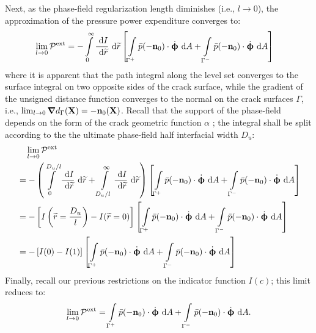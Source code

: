 Next, as the phase-field regularization length diminishes (i.e., $l \to 0$), the approximation of the pressure power expenditure converges to:
\begin{subequations}
  \begin{align}
    \lim_{l \to 0} \mathcal{P}^\text{ext} & = - \int\limits_0^\infty \dfrac{\text{ d}I}{\text{ d}\widetilde{r}} \text{ d}\widetilde{r} \left[ \int\limits_{\Gamma^+} \bar{p} (-\textbf{n}_0) \cdot \dot{\boldsymbol{\upphi}} \text{ d}A + \int\limits_{\Gamma^-} \bar{p} (-\textbf{n}_0) \cdot \dot{\boldsymbol{\upphi}} \text{ d}A \right] 
  \end{align}
\end{subequations}
where it is apparent that the path integral along the level set converges to the surface integral on two opposite sides of the crack surface, while the gradient of the unsigned distance function converges to the normal on the crack surfaces $\Gamma$, i.e., $\lim_{l \to 0} \boldsymbol{\nabla} d_\Gamma(\textbf{X}) = -\textbf{n}_0(\textbf{X})$. Recall that the support of the phase-field depends on the form of the crack geometric function $\alpha$ \cite{JYWu2017}; the integral shall be split according to the the ultimate phase-field half interfacial width $D_u$:
\begin{equation}
  \begin{aligned}
     & \quad \lim_{l \to 0} \mathcal{P}^\text{ext}                                                                                                                                                                                                                                                                                                            \\
     & = - \left( \int\limits_0^{D_u/l} \dfrac{\text{ d}I}{\text{ d}\widetilde{r}} \text{ d}\widetilde{r} + \int\limits_{D_u/l}^\infty \dfrac{\text{ d}I}{\text{ d}\widetilde{r}} \text{ d}\widetilde{r} \right) \left[ \int\limits_{\Gamma^+} \bar{p} (-\textbf{n}_0) \cdot \dot{\boldsymbol{\upphi}} \text{ d}A + \int\limits_{\Gamma^-} \bar{p} (-\textbf{n}_0) \cdot \dot{\boldsymbol{\upphi}} \text{ d}A \right] \\
     & = - \left[ I\left( \widetilde{r}=\dfrac{D_u}{l} \right) - I(\widetilde{r}=0) \right] \left[ \int\limits_{\Gamma^+} \bar{p} (-\textbf{n}_0) \cdot \dot{\boldsymbol{\upphi}} \text{ d}A + \int\limits_{\Gamma^-} \bar{p} (-\textbf{n}_0) \cdot \dot{\boldsymbol{\upphi}} \text{ d}A \right]                                                                                                          \\
     & = - \left[ I(0) - I(1) \right] \left[ \int\limits_{\Gamma^+} \bar{p} (-\textbf{n}_0) \cdot \dot{\boldsymbol{\upphi}} \text{ d}A + \int\limits_{\Gamma^-} \bar{p} (-\textbf{n}_0) \cdot \dot{\boldsymbol{\upphi}} \text{ d}A \right]                                                                                                                                                                
  \end{aligned}
\end{equation}
Finally, recall our previous restrictions on the indicator function $I(c)$; this limit reduces to:
\begin{align}
  \lim_{l \to 0} \mathcal{P}^\text{ext} = \int\limits_{\Gamma^+} \bar{p} (-\textbf{n}_0) \cdot \dot{\boldsymbol{\upphi}} \text{ d}A + \int\limits_{\Gamma^-} \bar{p} (-\textbf{n}_0) \cdot \dot{\boldsymbol{\upphi}} \text{ d}A.
\end{align}

